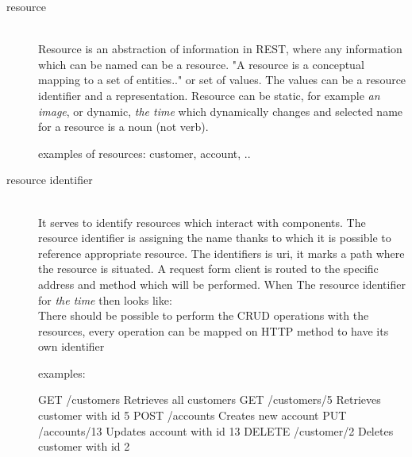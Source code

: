 \begin{description}
  \item [resource] \hfill \\ 
  Resource is an abstraction of information in REST, where any information which can be named can be a resource. "A resource is a conceptual mapping to a set of entities.." \cite{fielding} or set of values. The values can be a resource identifier and a representation.
  Resource can be static, for example \emph{an image}, or dynamic, \emph{the time} which dynamically changes and selected name for a resource is a noun (not verb).
  
  examples of resources: customer, account, ..

  \item [resource identifier] \hfill \\
  It serves to identify resources which interact with components. The resource identifier is assigning the name thanks to which it is possible to reference appropriate resource. The identifiers is \gls{uri}, it marks a path where the resource is situated. A request form client is routed to the specific address and method which will be performed. When 
  The resource identifier for \emph{the time} then looks like: \hfill \\
There should be possible to perform the CRUD operations with the resources, every operation can be mapped on HTTP method to have its own identifier

examples:

GET     /customers      Retrieves all customers
GET     /customers/5    Retrieves customer with id 5
POST    /accounts       Creates new account
PUT     /accounts/13    Updates account with id 13
DELETE  /customer/2     Deletes customer with id 2   


\end{description}

